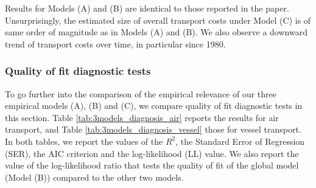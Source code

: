 \documentclass[11pt,twoside, authoryear]{elsarticle}
\begin{document}
Results for Models (A) and (B) are identical to those reported in the paper. Unsurprisingly, the estimated size of overall transport costs under Model (C) is of same order of magnitude as in Models (A) and (B). We also observe a downward trend of transport costs over time, in particular since 1980.\\



\subsubsection{Quality of fit diagnostic tests}

To go further into the comparison of the empirical relevance of our three empirical models (A), (B) and (C), we compare quality of fit diagnostic tests in this section. Table \ref{tab:3models_diagnosis_air} reports the results for air transport, and Table \ref{tab:3models_diagnosis_vessel} those for vessel transport. In both tables, we report the values of the $R^2$, the Standard Error of Regression (SER), the AIC criterion  and the log-likelihood (LL) value. We also report the value of the log-likelihood ratio that tests the quality of fit of the global model (Model (B)) compared to the other two models.
\end{document}
